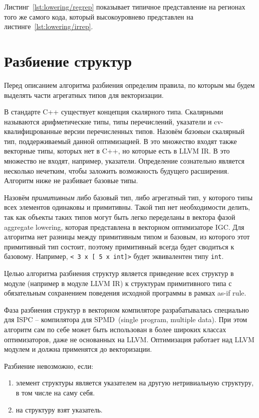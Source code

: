 Листинг~\cref{lst:lowering/regrep} показывает типичное представление на регионах того же самого кода, который высокоуровнево представлен на листинге~\cref{lst:lowering/irrep}.

\section{Разбиение структур}\label{sec:lowering/splitter}

Перед описанием алгоритма разбиения определим правила, по которым мы будем выделять части агрегатных типов для векторизации.

В стандарте C++ существует концепция скалярного типа.
Скалярными называются арифметические типы, типы перечислений, указатели и cv-квалифицрованные версии перечисленных типов.
Назовём \emph{базовым} скалярный тип, поддерживаемый данной оптимизацией.
В это множество входят также векторные типы, которых нет в C++, но которые есть в LLVM IR. 
В это множество не входят, например, указатели.
Определение сознательно является несколько нечетким, чтобы заложить возможность будущего расширения.
Алгоритм ниже не разбивает базовые типы.

Назовём \emph{примитивным} либо базовый тип, либо агрегатный тип, у которого типы всех элементов одинаковы и примитивны.
Такой тип нет необходимости делить, так как объекты таких типов могут быть легко переделаны в вектора фазой aggregate lowering, которая представлена в векторном оптимизаторе IGC.
Для алгоритма нет разницы между примитивным типом и базовым, из которого этот примитивный тип состоит, поэтому примитивный всегда будет сводиться к базовому. Например, \verb|< 3 x [ 5 x int]>| будет эквивалентен типу \verb|int|.

Целью алгоритма разбиения структур является приведение всех структур в модуле (например в модуле LLVM IR) к структурам примитивного типа с обязательным сохранением поведения исходной программы в рамках as-if rule.

Фаза разбиения структур в векторном компиляторе разрабатывалась специально для ISPC -- компилятора для SPMD~(single program, multiple data).
При этом алгоритм сам по себе может быть использован в более широких классах оптимизаторов, даже не основанных на LLVM.
Оптимизация работает над LLVM модулем и должна применятся до векторизации.

Разбиение невозможно, если:
\begin{enumerate}
\item элемент структуры является указателем на другую нетривиальную структуру, в том числе на саму себя.
\item на структуру взят указатель.
\end{enumerate}


